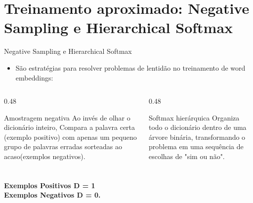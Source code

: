 
\section{Treinamento aproximado: Negative Sampling e Hierarchical Softmax}

\begin{frame}{Negative Sampling e Hierarchical Softmax}
    \small
    \begin{itemize}
        \item São estratégias  para resolver problemas de lentidão no treinamento de word embeddings:
    \end{itemize}
    \vspace{-0.1cm}


    \begin{columns}[t]
        \begin{column}{0.48\textwidth}
            \begin{block}{Amostragem negativa}
                \footnotesize
               Ao invés de olhar o dicionário inteiro, Compara a palavra certa (exemplo positivo) com apenas um pequeno grupo de palavras erradas sorteadas ao acaso(exemplos negativos). \\\\\\
               \vspace{-0.1cm}
\textbf{Exemplos Positivos D = 1 
\\Exemplos Negativos D = 0.}
            \end{block}
        \end{column}
        \begin{column}{0.48\textwidth}
            \begin{block}{Softmax hierárquica}
                \footnotesize
                Organiza todo o dicionário dentro de uma árvore binária, transformando o problema em uma sequência de escolhas de "sim ou não".
            \end{block}
        \end{column}
    \end{columns}


\end{frame}
